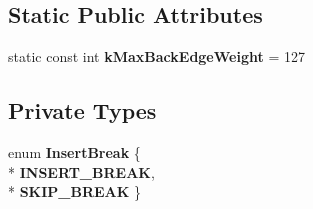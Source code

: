 \subsection*{Static Public Attributes}
\begin{DoxyCompactItemize}
\item 
static const int {\bfseries k\+Max\+Back\+Edge\+Weight} = 127\hypertarget{classv8_1_1internal_1_1_full_code_generator_a00b2d79958759123bf732ba47d12fc6d}{}\label{classv8_1_1internal_1_1_full_code_generator_a00b2d79958759123bf732ba47d12fc6d}

\end{DoxyCompactItemize}
\subsection*{Private Types}
\begin{DoxyCompactItemize}
\item 
enum {\bfseries Insert\+Break} \{ \\*
{\bfseries I\+N\+S\+E\+R\+T\+\_\+\+B\+R\+E\+AK}, 
\\*
{\bfseries S\+K\+I\+P\+\_\+\+B\+R\+E\+AK}
 \}\hypertarget{classv8_1_1internal_1_1_full_code_generator_a891a6039605c383b89779ca55155ee27}{}\label{classv8_1_1internal_1_1_full_code_generator_a891a6039605c383b89779ca55155ee27}

\end{DoxyCompactItemize}

